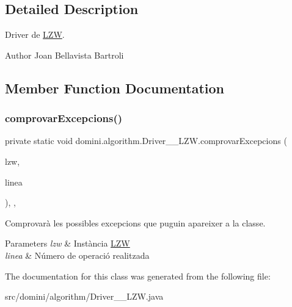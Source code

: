 \subsection{Detailed Description}
Driver de \hyperlink{classdomini_1_1algorithm_1_1LZW}{L\+ZW}. 

\begin{DoxyAuthor}{Author}
Joan Bellavista Bartroli 
\end{DoxyAuthor}


\subsection{Member Function Documentation}
\mbox{\label{classdomini_1_1algorithm_1_1Driver____LZW_a3f609a2c3a22d0c7d11a5ff4e015e433}} 
\subsubsection{\texorpdfstring{comprovar\+Excepcions()}{comprovarExcepcions()}}
{\footnotesize\ttfamily private static void domini.\+algorithm.\+Driver\+\_\+\+\_\+\+L\+Z\+W.\+comprovar\+Excepcions (\begin{DoxyParamCaption}\item[{\hyperlink{classdomini_1_1algorithm_1_1LZW}{L\+ZW}}]{lzw,  }\item[{String}]{linea }\end{DoxyParamCaption})\hspace{0.3cm}{\ttfamily [inline]}, {\ttfamily [static]}, {\ttfamily [private]}}



Comprovarà les possibles excepcions que puguin apareixer a la classe. 


\begin{DoxyParams}{Parameters}
{\em lzw} & Instància \hyperlink{classdomini_1_1algorithm_1_1LZW}{L\+ZW} \\
\hline
{\em linea} & Número de operació realitzada \\
\hline
\end{DoxyParams}


The documentation for this class was generated from the following file\+:\begin{DoxyCompactItemize}
\item 
src/domini/algorithm/Driver\+\_\+\+\_\+\+L\+Z\+W.\+java\end{DoxyCompactItemize}
